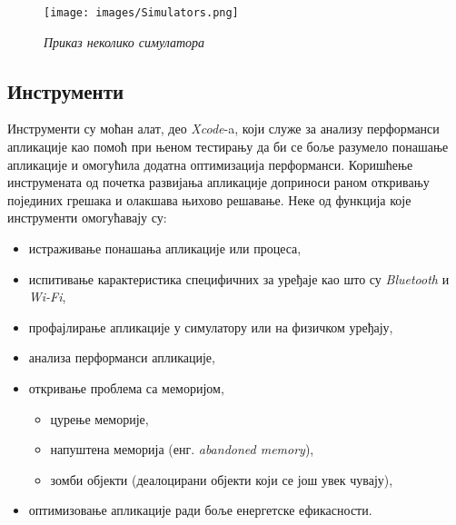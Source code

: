 \documentclass[12pt,oneside]{memoir}
\begin{document}
\begin{figure}[H]
\texttt{[image: images/Simulators.png]}
\centering
\caption{\textit{Приказ неколико симулатора}}
\label{slika:simulatori}
\end{figure}

\subsection{Инструменти}

\indent Инструменти су моћан алат, део \textit{Xcode}-a, који служе за анализу перформанси апликације као помоћ при њеном тестирању да би се боље разумело понашање апликације и омогућила додатна оптимизација перформанси. Коришћење инструмената од почетка развијања апликације доприноси раном откривању појединих грешака и олакшава њихово решавање. 
Неке од функција које инструменти омогућавају су:
\begin{itemize}
    \item истраживање понашања апликације или процеса,
    \item испитивање карактеристика специфичних за уређаје као што су \textit{Bluetooth} и \textit{Wi-Fi},
    \item профајлирање апликације у симулатору или на физичком уређају,
    \item анализа перформанси апликације,
    \item откривање проблема са меморијом,
    
    \begin{itemize}
        \item цурење меморије,
        \item напуштена меморија (енг. \textit{abandoned memory}),
        \item зомби објекти (деалоцирани објекти који се још увек чувају),
    \end{itemize}
    
    \item оптимизовање апликације ради боље енергетске ефикасности.
\end{itemize}
\end{document}
